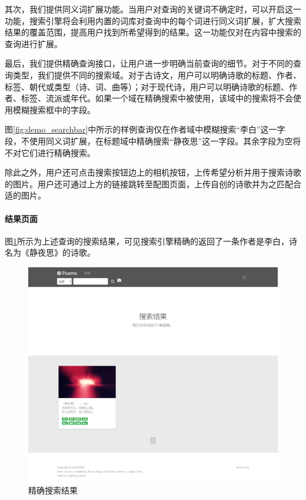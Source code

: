 \documentclass[a4paper, 10pt]{article}
\begin{document}
其次，我们提供同义词扩展功能。当用户对查询的关键词不确定时，可以开启这一功能，搜索引擎将会利用内置的词库对查询中的每个词进行同义词扩展，扩大搜索结果的覆盖范围，提高用户找到所希望得到的结果。这一功能仅对在内容中搜索的查询进行扩展。

最后，我们提供精确查询接口，让用户进一步明确当前查询的细节。对于不同的查询类型，我们提供不同的搜索域。对于古诗文，用户可以明确诗歌的标题、作者、标签、朝代或类型（诗、词、曲等）；对于现代诗，用户可以明确诗歌的标题、作者、标签、流派或年代。如果一个域在精确搜索中被使用，该域中的搜索将不会使用模糊搜索框中的字段。

图\ref{fig:demo_searchbar}中所示的样例查询仅在作者域中模糊搜索“李白”这一字段，不使用同义词扩展，在标题域中精确搜索“静夜思”这一字段。其余字段为空将不对它们进行精确搜索。

除此之外，用户还可点击搜索按钮边上的相机按钮，上传希望分析并用于搜索诗歌的图片。用户还可通过上方的链接跳转至配图页面，上传自创的诗歌并为之匹配合适的图片。


\paragraph*{结果页面} 图\ref{fig:demo_accres}所示为上述查询的搜索结果，可见搜索引擎精确的返回了一条作者是李白，诗名为《静夜思》的诗歌。

\begin{figure}[H]
\centering
\includegraphics[scale=0.48]{fig/demo_accres.png}
\caption{精确搜索结果}
\label{fig:demo_accres}
\end{figure}
\end{document}
